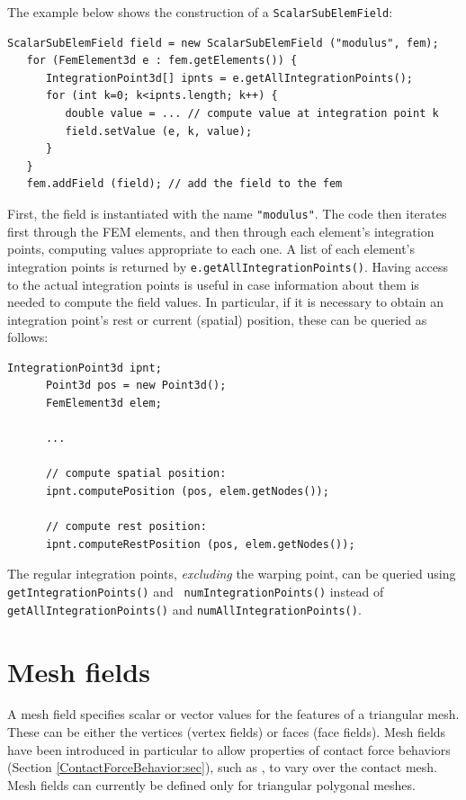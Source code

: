 The example below shows the construction of a {\tt ScalarSubElemField}:
%
\begin{lstlisting}[]
   ScalarSubElemField field = new ScalarSubElemField ("modulus", fem);
   for (FemElement3d e : fem.getElements()) {
      IntegrationPoint3d[] ipnts = e.getAllIntegrationPoints();
      for (int k=0; k<ipnts.length; k++) {
         double value = ... // compute value at integration point k
         field.setValue (e, k, value);
      }
   }
   fem.addField (field); // add the field to the fem
\end{lstlisting}
%
First, the field is instantiated with the name {\tt "modulus"}.  The
code then iterates first through the FEM elements, and then through
each element's integration points, computing values appropriate to
each one. A list of each element's integration points is returned by
{\tt e.getAllIntegrationPoints()}. Having access to the actual
integration points is useful in case information about them is needed
to compute the field values. In particular, if it is necessary to
obtain an integration point's rest or current (spatial) position,
these can be queried as follows:
%
\begin{lstlisting}[]
      IntegrationPoint3d ipnt;
      Point3d pos = new Point3d();
      FemElement3d elem;

      ...

      // compute spatial position:
      ipnt.computePosition (pos, elem.getNodes());

      // compute rest position:
      ipnt.computeRestPosition (pos, elem.getNodes());
\end{lstlisting}
%

\begin{sideblock}
The regular integration points, {\it excluding} the warping point, can
be queried using {\tt getIntegrationPoints()} and {\tt
numIntegrationPoints()} instead of {\tt getAllIntegrationPoints()}
and {\tt numAllIntegrationPoints()}.
\end{sideblock}

\section{Mesh fields}
\label{sec:meshFields}

A mesh field specifies scalar or vector values for the features of a triangular
mesh. These can be either the vertices (vertex fields) or faces
(face fields). Mesh fields have been introduced in particular to allow
properties of contact force behaviors
(Section \ref{ContactForceBehavior:sec}), such as 
,
to vary over the contact mesh. Mesh fields can currently be defined
only for triangular polygonal meshes.


